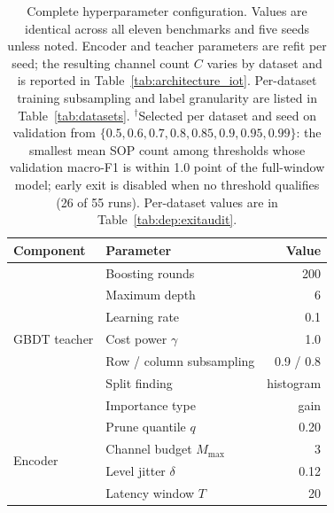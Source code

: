\begin{table}[!t]
\centering
\caption{Complete hyperparameter configuration. Values are identical across all
eleven benchmarks and five seeds unless noted. Encoder and teacher parameters
are refit per seed; the resulting channel count $C$ varies by dataset and is
reported in Table~\ref{tab:architecture_iot}. Per-dataset training subsampling and
label granularity are listed in Table~\ref{tab:datasets}.
$^\dagger$Selected per dataset and seed on validation from
$\{0.5,0.6,0.7,0.8,0.85,0.9,0.95,0.99\}$: the smallest mean SOP count among thresholds
whose validation macro-F1 is within 1.0 point of the full-window model; early exit is
disabled when no threshold qualifies (26 of 55 runs). Per-dataset values are in
Table~\ref{tab:dep:exitaudit}.}
\label{tab:hyperparams}
\small
\begin{tabular}{llr}
\toprule
Component & Parameter & Value \\
\midrule
\multirow{7}{*}{GBDT teacher}
 & Boosting rounds        & 200 \\
 & Maximum depth          & 6 \\
 & Learning rate          & 0.1 \\
 & Cost power $\gamma$    & 1.0 \\
 & Row / column subsampling & 0.9 / 0.8 \\
 & Split finding          & histogram \\
 & Importance type        & gain \\
\midrule
\multirow{4}{*}{Encoder}
 & Prune quantile $q$          & 0.20 \\
 & Channel budget $M_{\max}$   & 3 \\
 & Level jitter $\delta$       & 0.12 \\
 & Latency window $T$          & 20 \\
\midrule

\end{tabular}
\end{table}
